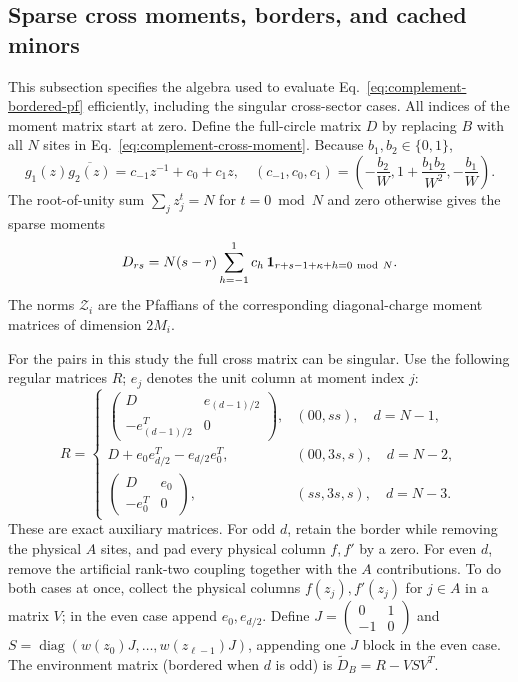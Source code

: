 \subsection{Sparse cross moments, borders, and cached minors}
\label{sec:complement-pf-details}
This subsection specifies the algebra used to evaluate
Eq.~\eqref{eq:complement-bordered-pf} efficiently, including the
singular cross-sector cases. All indices of the moment matrix start
at zero. Define the full-circle matrix $D$ by replacing $B$ with
all $N$ sites in Eq.~\eqref{eq:complement-cross-moment}.
Because $b_1,b_2\in\{0,1\}$,
\begin{equation}
 g_1(z)\overline{g_2(z)}
 =c_{-1}z^{-1}+c_0+c_1z,\quad
 (c_{-1},c_0,c_1)=
 \left(-\frac{b_2}{W},1+\frac{b_1b_2}{W^2},-\frac{b_1}{W}\right).
 \label{eq:complement-laurent}
\end{equation}
The root-of-unity sum $\sum_jz_j^t=N$ for $t=0\bmod N$ and zero
otherwise gives the sparse moments
\begin{equation}
 D_{rs}=N(s-r)\sum_{h=-1}^{1}
          c_h\,\mathbf1_{r+s-1+\kappa+h=0\ {\rm mod}\ N}.
 \label{eq:complement-sparse-moments}
\end{equation}
The norms $\mathcal Z_i$ are the Pfaffians of the corresponding
diagonal-charge moment matrices of dimension $2M_i$.

For the pairs in this study the full cross matrix can be singular.
Use the following regular matrices $R$; $e_j$ denotes the unit column
at moment index $j$:
\begin{equation}
 R=\begin{cases}
 \begin{pmatrix}D&e_{(d-1)/2}\\-e_{(d-1)/2}^T&0\end{pmatrix},
       &(00,ss),\quad d=N-1,\\[2mm]
 D+e_0e_{d/2}^T-e_{d/2}e_0^T,
       &(00,3s,s),\quad d=N-2,\\[1mm]
 \begin{pmatrix}D&e_0\\-e_0^T&0\end{pmatrix},
       &(ss,3s,s),\quad d=N-3 .
 \end{cases}
 \label{eq:complement-regularizer}
\end{equation}
These are exact auxiliary matrices. For odd $d$, retain the border
while removing the physical $A$ sites, and pad every physical column
$f,f'$ by a zero. For even $d$, remove the artificial rank-two
coupling together with the $A$ contributions. To do both cases at once,
collect the physical columns $f(z_j),f'(z_j)$ for $j\in A$ in a matrix
$V$; in the even case append $e_0,e_{d/2}$. Define
$J=\left(\begin{smallmatrix}0&1\\-1&0\end{smallmatrix}\right)$ and
$S=\operatorname{diag}(w(z_0)J,\ldots,w(z_{\ell-1})J)$,
appending one $J$ block in the even case.
The environment matrix (bordered when $d$ is odd) is
$\widetilde D_B=R-VSV^T$.

